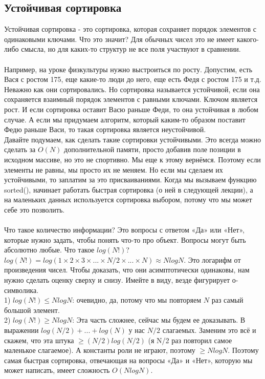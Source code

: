 \documentclass[a4paper,12pt]{article}
\begin{document}
\subsection{Устойчивая сортировка}
Устойчивая сортировка - это сортировка, которая сохраняет порядок элементов с одинаковыми ключами. Что это значит? Для обычных чисел это не имеет какого-либо смысла, но для каких-то структур не все поля участвуют в сравнении.\\
\\Например, на уроке физкультуры нужно выстроиться по росту. Допустим, есть Вася с ростом 175, еще какие-то люди до него, еще есть Федя с ростом 175 и т.д. Неважно как они сортировались. Но сортировка называется устойчивой, если она сохраняется взаимный порядок элементов с равными ключами. Ключом является рост. И если сортировка оставит Васю раньше Феди, то она устойчивая в любом случае. А если мы придумаем алгоритм, который каким-то образом поставит Федю раньше Васи, то такая сортировка является неустойчивой. \\
Давайте подумаем, как сделать такие сортировки устойчивыми. Это всегда можно сделать за $O(N)$ дополнительной памяти, просто добавив поле позиции в исходном массиве, но это не спортивно. Мы еще к этому вернёмся. Поэтому если элементы не равны, мы просто их не меняем. Но если мы сделаем их устойчивыми, то заплатим за это присваиваниями. Когда мы вызываем функцию sorted(), начинает работать быстрая сортировка (о ней в следующей лекции), а на маленьких данных используется сортировка выбором, потому что мы может себе это позволить. \\
\\
Что такое количество информации? Это вопросы с ответом «Да» или «Нет», которые нужно задать, чтобы понять что-то про объект. Вопросы могут быть абсолютно любые. 
Что такое $log(N!)$? $log(N!) = log(1 \times 2 \times 3 \times ... \times N/2 \times ... \times N) \approx NlogN$. Это логарифм от произведения чисел. Чтобы доказать, что они асимптотически одинаковы, нам нужно сделать оценку сверху и снизу. Имейте в виду, везде фигурирует о-символика.\\
1) $log(N!) \leq NlogN$: очевидно, да, потому что мы повторяем $N$ раз самый большой элемент.\\
2) $log(N!) \geq NlogN$: Эта часть сложнее, сейчас мы будем ее доказывать. В выражении $log(N/2) + ... + log(N)$ у нас $N/2$ слагаемых. Заменим это всё и скажем, что эта штука $\geq (N/2)log(N/2)$ (я N/2 раз повторил самое маленькое слагаемое). А константы роли не играют, поэтому $\geq NlogN$. Поэтому самая быстрая сортировка, отвечающая на вопросы «Да» и «Нет», которую мы может написать, имеет сложность $O(NlogN)$. \\
\end{document}
